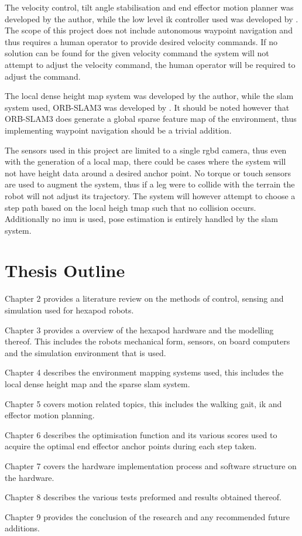 The velocity control, tilt angle stabilisation and end effector motion planner was developed by the author, while the low level \ac*{ik} controller used was developed
by \citep{erasmus2023guidance}. The scope of this project does not include autonomous waypoint navigation and thus requires a human operator to provide desired velocity
commands. If no solution can be found for the given velocity command the system will not attempt to adjust the velocity command, the human operator will be required to
adjust the command.

The local dense height map system was developed by the author, while the \ac{slam} system used, ORB-SLAM3 was developed by \cite{campos2021orb}.
It should be noted however that ORB-SLAM3 does generate a global sparse feature map of the environment, thus implementing waypoint navigation should be a trivial addition.

The sensors used in this project are limited to a single \ac{rgbd} camera, thus even with the generation of a local map, there could be cases where the system will not have
height data around a desired anchor point. No torque or touch sensors are used to augment the system, thus if a leg were to collide with the terrain the robot will not adjust its trajectory.
The system will however attempt to choose a step path  based on the local heigh tmap such that no collision occurs. Additionally no \ac{imu} is used, pose estimation
is entirely handled by the \ac{slam} system.

\section{Thesis Outline}

Chapter 2 provides a literature review on the methods of control, sensing and simulation used for hexapod robots.

Chapter 3 provides a overview of the hexapod hardware and the modelling thereof. This includes the robots mechanical form, sensors, on board computers and the simulation environment
that is used.

Chapter 4 describes the environment mapping systems used, this includes the local dense height map and the sparse \ac{slam} system.

Chapter 5 covers motion related topics, this includes the walking gait, \ac{ik} and effector motion planning.

Chapter 6 describes the optimisation function and its various scores used to acquire the optimal end effector anchor points during each step taken.

Chapter 7 covers the hardware implementation process and software structure on the hardware.

Chapter 8 describes the various tests preformed and results obtained thereof.

Chapter 9 provides the conclusion of the research and any recommended future additions.


